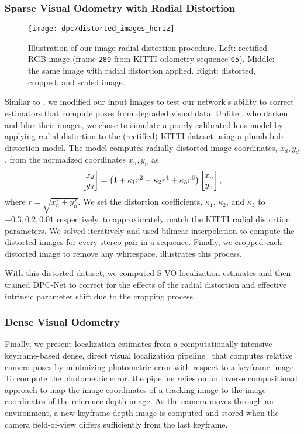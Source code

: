 \subsubsection{Sparse Visual Odometry with Radial Distortion}

\begin{figure*}
	\centering
	\texttt{[image: dpc/distorted\_images\_horiz]}
	\caption{Illustration of our image radial distortion procedure. Left: rectified RGB image  (frame \texttt{280} from KITTI odometry sequence \texttt{05}). Middle: the same image with radial distortion applied. Right: distorted, cropped, and scaled image.}
	\label{fig:distorted_images}
	\vspace{-0.4cm}
\end{figure*}

Similar to \cite{Costante2016-hb}, we modified our input images to test our network's ability to correct estimators that compute poses from degraded visual data. Unlike \cite{Costante2016-hb}, who darken and blur their images, we chose to simulate a poorly calibrated lens model by applying radial distortion to the (rectified) KITTI dataset using a plumb-bob distortion model. The model computes radially-distorted image coordinates, $x_d, y_d$, from the normalized coordinates $x_n, y_n$ as
\begin{equation}
	\label{eq:radial_distortion}
	\begin{bmatrix} x_d \\ y_d \end{bmatrix} = \left( 1 + \kappa_1 r^2 + \kappa_2 r^4 + \kappa_3 r^6  \right) \begin{bmatrix} x_n \\ y_n \end{bmatrix},
\end{equation}
where $r = \sqrt{x_n^2 + y_n^2}$. We set the distortion coefficients, $\kappa_1$, $\kappa_2$, and $\kappa_3$ to $-0.3,0.2,0.01$ respectively, to approximately match the KITTI radial distortion parameters. We solved  iteratively and used bilinear interpolation to compute the distorted images for every stereo pair in a sequence. Finally, we cropped each distorted image to remove any whitespace.  illustrates this process. 

With this distorted dataset, we computed S-VO localization estimates and then trained DPC-Net to correct for the effects of the radial distortion and effective intrinsic parameter shift due to the cropping process.



\subsubsection{Dense Visual Odometry}
Finally, we present localization estimates from a computationally-intensive keyframe-based dense, direct visual localization pipeline~\cite{Clement2018-cat} that computes relative camera poses by minimizing photometric error with respect to a keyframe image. To compute the photometric error, the pipeline relies on an inverse compositional approach to map the image coordinates of a tracking image to the image coordinates of the reference depth image. As the camera moves through an environment, a new keyframe depth image is computed and stored when the camera field-of-view differs sufficiently from the last keyframe. 

